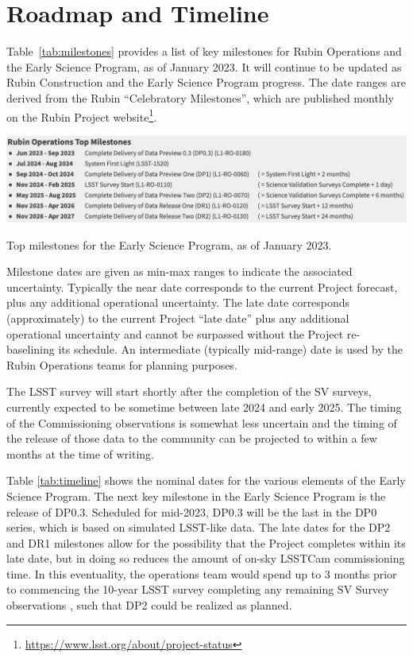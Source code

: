 \section{Roadmap and Timeline} \label{sec:timeline}

Table~\ref{tab:milestones} provides a list of key milestones for Rubin Operations and the Early Science Program, as of January 2023.
It will continue to be updated as Rubin Construction and the Early Science Program progress. 
The date ranges are derived from the Rubin ``Celebratory Milestones'', which are  published monthly on the Rubin Project website\footnote{\url{https://www.lsst.org/about/project-status}}. 

\begin{table}[ht]
\centering
\includegraphics[width=\linewidth]{figures/DPR-milestones}
\caption{Top milestones for the Early Science Program, as of January 2023.}
\label{tab:milestones}
\end{table}

Milestone dates are given as min-max ranges to indicate the associated uncertainty. 
Typically the near date corresponds to the current Project forecast, plus any additional operational uncertainty.
The late date corresponds (approximately) to the current Project ``late date'' plus any additional operational uncertainty and cannot be surpassed without the Project re-baselining its schedule.
An intermediate (typically mid-range) date is used by the Rubin Operations teams for planning purposes. 

The LSST survey will start shortly after the completion of the SV surveys, currently expected to be sometime between late 2024 and early 2025.
The timing of the Commissioning observations is somewhat less uncertain and the timing of the release of those data to the community can be projected to within a few months at the time of writing.

Table \ref{tab:timeline} shows the nominal  dates for the various elements of the Early Science Program. 
The next key milestone in the Early Science Program is the release of DP0.3. 
Scheduled for mid-2023, DP0.3 will be the last in the DP0 series, which is based on simulated LSST-like data. 
The late dates for the DP2 and DR1 milestones allow for the possibility that the Project completes within its late date, but in doing so reduces the amount of on-sky LSSTCam commissioning time.
In this eventuality, the operations team would spend up to 3 months prior to commencing the 10-year LSST survey completing any remaining SV Survey observations , such that DP2 could be realized as planned.

